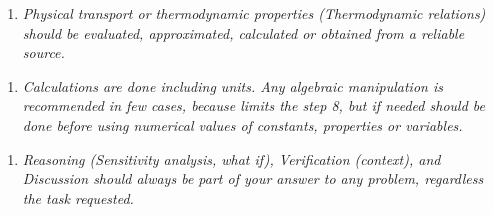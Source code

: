 \documentclass{article}
\begin{document}
\begin{enumerate}[resume]
\item \textit{Physical transport or thermodynamic properties (Thermodynamic relations) should be evaluated, approximated, calculated or obtained from a reliable source.}
\end{enumerate}



\begin{enumerate}[resume]
\item \textit{Calculations are done including units. Any algebraic manipulation is recommended in few cases, because limits the step 8, but if needed should be done before using numerical values of constants, properties or variables.}
\end{enumerate}



\begin{enumerate}[resume]
\item \textit{Reasoning (Sensitivity analysis, what if), Verification (context), and Discussion should always be part of your answer to any problem, regardless the task requested.}
\end{enumerate}



\printbibliography[title={References}]
\end{document}
